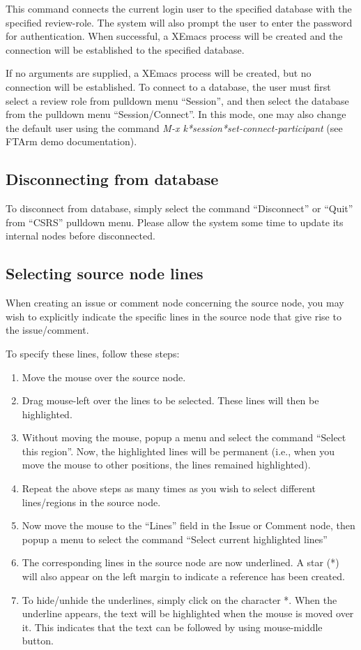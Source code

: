 This command connects the current login user to the specified database
with the specified review-role. The system will also prompt the user to
enter the password for authentication.
When successful, a XEmacs process will be created
and the connection will be established to the specified database.

If no arguments are supplied, a XEmacs process will be created, but no
connection will be established. To connect to a database,
the user must first select a review role from pulldown menu
``Session'', and then select the database from the pulldown
menu ``Session/Connect''. In this mode, one may also change the
default user using the command {\it M-x
k*session*set-connect-participant} (see FTArm demo documentation).


\subsection {Disconnecting from database}
To disconnect from database, simply select the command ``Disconnect''
or ``Quit'' from ``CSRS'' pulldown menu. Please allow the system some
time to update its internal nodes before disconnected.

\subsection {Selecting source node lines}
When creating an issue or comment node concerning the source node, you
may wish to explicitly indicate the specific lines in the source node
that give rise to the issue/comment.

\noindent To specify these lines, follow these steps:
\begin{enumerate}
\item Move the mouse over the source node.
\item Drag mouse-left over the lines to be selected. These lines will
then be highlighted.
\item Without moving the mouse, popup a menu and select the command
``Select this region''. Now, the highlighted lines will be permanent
(i.e., when you move the mouse to other positions, the lines remained
highlighted).
\item Repeat the above steps as many times as you wish to select
 different lines/regions in the source node.
\item  Now move the mouse to the ``Lines'' field in the Issue or
Comment node, then popup a menu to select the command ``Select current
highlighted lines''
\item The corresponding lines in the source node are now underlined.
A star (*) will also appear on the left margin to indicate a reference
has been created.
\item To hide/unhide the underlines, simply click on the character *.
When the underline appears, the text will be highlighted when the
mouse is moved over it. 
This indicates that the text can be followed by using 
mouse-middle button.

\end{enumerate}


